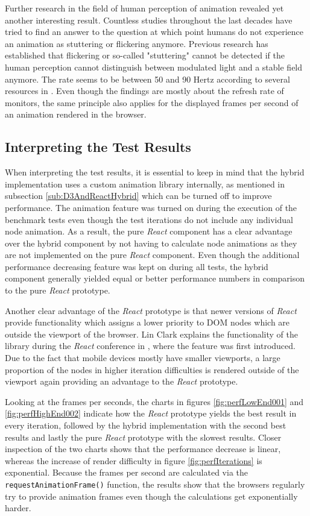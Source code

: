 Further research in the field of human perception of animation revealed yet another interesting result. Countless studies throughout the last decades have tried to find an answer to the question at which point humans do not experience an animation as stuttering or flickering anymore. Previous research has established that flickering or so-called "stuttering" cannot be detected if the human perception cannot distinguish between modulated light and a stable field anymore. The rate seems to be between 50 and 90 Hertz according to several resources in \cite{6375944,farrell1987predicting,stereoscopicFlickerArticle}. Even though the findings are mostly about the refresh rate of monitors, the same principle also applies for the displayed frames per second of an animation rendered in the browser.

\subsection{Interpreting the Test Results}

When interpreting the test results, it is essential to keep in mind that the hybrid implementation uses a custom animation library internally, as mentioned in subsection \ref{sub:D3AndReactHybrid} which can be turned off to improve performance. The animation feature was turned on during the execution of the benchmark tests even though the test iterations do not include any individual node animation. As a result, the pure \emph{React} component has a clear advantage over the hybrid component by not having to calculate node animations as they are not implemented on the pure \emph{React} component. Even though the additional performance decreasing feature was kept on during all tests, the hybrid component generally yielded equal or better performance numbers in comparison to the pure \emph{React} prototype.

Another clear advantage of the \emph{React} prototype is that newer versions of \emph{React} provide functionality which assigns a lower priority to DOM nodes which are outside the viewport of the browser. Lin Clark explains the functionality of the library during the \emph{React} conference in \cite{ReactReconcliliationVideo}, where the feature was first introduced. Due to the fact that mobile devices mostly have smaller viewports, a large proportion of the nodes in higher iteration difficulties is rendered outside of the viewport again providing an advantage to the \emph{React} prototype.

Looking at the frames per seconds, the charts in figures \ref{fig:perfLowEnd001} and \ref{fig:perfHighEnd002} indicate how the \emph{React} prototype yields the best result in every iteration, followed by the hybrid implementation with the second best results and lastly the pure \emph{React} prototype with the slowest results. Closer inspection of the two charts shows that the performance decrease is linear, whereas the increase of render difficulty in figure \ref{fig:perfIterations} is exponential. Because the frames per second are calculated via the \texttt{requestAnimationFrame()} function, the results show that the browsers regularly try to provide animation frames even though the calculations get exponentially harder.

